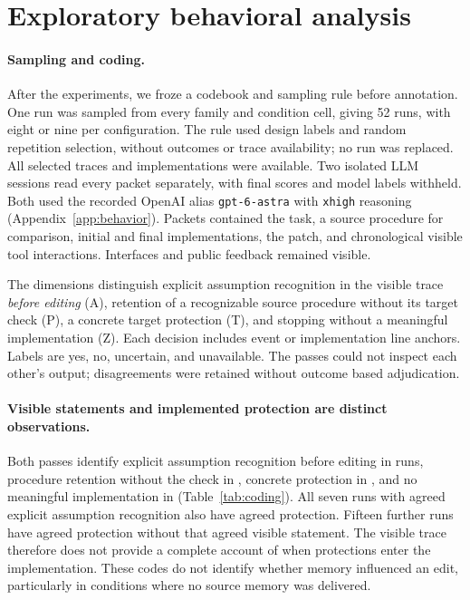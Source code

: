 \section{Exploratory behavioral analysis}
\label{sec:behavior}
\paragraph{Sampling and coding.}
After the experiments, we froze a codebook and sampling rule before annotation. One run was sampled from every family and condition cell, giving 52 runs, with eight or nine per configuration. The rule used design labels and random repetition selection, without outcomes or trace availability; no run was replaced. All selected traces and implementations were available. Two isolated LLM sessions read every packet separately, with final scores and model labels withheld. Both used the recorded OpenAI alias \texttt{gpt-6-astra} with \texttt{xhigh} reasoning (Appendix~\ref{app:behavior}). Packets contained the task, a source procedure for comparison, initial and final implementations, the patch, and chronological visible tool interactions. Interfaces and public feedback remained visible.

The dimensions distinguish explicit assumption recognition in the visible trace \emph{before editing} (A), retention of a recognizable source procedure without its target check (P), a concrete target protection (T), and stopping without a meaningful implementation (Z). Each decision includes event or implementation line anchors. Labels are yes, no, uncertain, and unavailable. The passes could not inspect each other's output; disagreements were retained without outcome based adjudication.

\begin{table}[t]
\centering\small
\caption{Two model assisted coding passes over the same 52 sampled runs. ``Both Y'' requires two positive labels; agreement includes uncertain and unavailable labels. Counts describe the sample, not behavioral prevalence across all 624 runs. Full label distributions and all eight disagreements are preserved in Appendix~\ref{app:behavior}.}
\label{tab:coding}
\end{table}

\paragraph{Visible statements and implemented protection are distinct observations.}
Both passes identify explicit assumption recognition before editing in \CodeABothYes{} runs, procedure retention without the check in \CodePBothYes{}, concrete protection in \CodeTBothYes{}, and no meaningful implementation in \CodeZBothYes{} (Table~\ref{tab:coding}). All seven runs with agreed explicit assumption recognition also have agreed protection. Fifteen further runs have agreed protection without that agreed visible statement. The visible trace therefore does not provide a complete account of when protections enter the implementation. These codes do not identify whether memory influenced an edit, particularly in conditions where no source memory was delivered.

